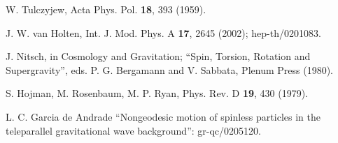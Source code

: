 \documentclass[a4paper,12pt]{article}
\begin{document}
\begin{thebibliography}{99}
  W. Tulczyjew, Acta Phys. Pol. \textbf{18}, 393 (1959).

  J. W. van Holten, Int. J. Mod. Phys. A \textbf{17}, 2645
(2002); hep-th/0201083.

  J. Nitsch, in Cosmology and Gravitation; ``Spin, Torsion,
Rotation and Supergravity'', eds. P. G. Bergamann and V. Sabbata, Plenum
Press (1980).

  S. Hojman, M. Rosenbaum, M. P. Ryan, Phys. Rev. D \textbf{19},
430 (1979).

  L. C. Garcia de Andrade {\small ``}Nongeodesic motion of
spinless particles in the teleparallel gravitational wave background'':
gr-qc/0205120.
\end{thebibliography}
\end{document}
